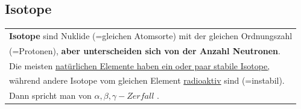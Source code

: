 \subsection{Isotope}
\begin{tabular}{l}
	\textbf{Isotope} sind Nuklide (=gleichen Atomsorte) mit der gleichen Ordnungszahl \\ (=Protonen),
	\textbf{aber unterscheiden sich von der Anzahl Neutronen}. \\ 
	Die meisten \underline{natürlichen Elemente haben ein oder paar stabile Isotope,} \\
	während andere Isotope vom gleichen Element \underline{radioaktiv} sind (=instabil). \\ Dann spricht man von $\alpha , \beta , \gamma -Zerfall$ . \\

\end{tabular}
  
           